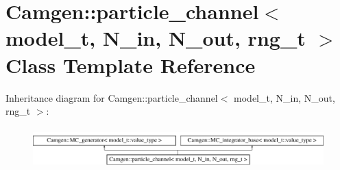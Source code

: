 \hypertarget{a00401}{}\section{Camgen\+:\+:particle\+\_\+channel$<$ model\+\_\+t, N\+\_\+in, N\+\_\+out, rng\+\_\+t $>$ Class Template Reference}
\label{a00401}
Inheritance diagram for Camgen\+:\+:particle\+\_\+channel$<$ model\+\_\+t, N\+\_\+in, N\+\_\+out, rng\+\_\+t $>$\+:\begin{figure}[H]
\begin{center}
\leavevmode
\includegraphics[height=1.609195cm]{a00401}
\end{center}
\end{figure}

